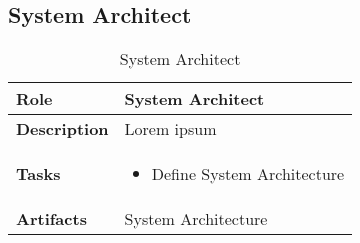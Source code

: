 \subsection{System Architect} 
\begin{table}
	[h!] \caption{System Architect} \label{table:ch6_Role_System_Architect} \centering 
	\begin{tabular}
		{|m{2cm}|m{10cm}|} \hline \bfseries Role & System Architect\\
		\hline \bfseries Description & Lorem ipsum\\
		\hline \bfseries Tasks & 
		\begin{itemize}
			\item Define System Architecture 
		\end{itemize}
		\\
		\hline \bfseries Artifacts & System Architecture\\
		\hline 
	\end{tabular}
\end{table}


